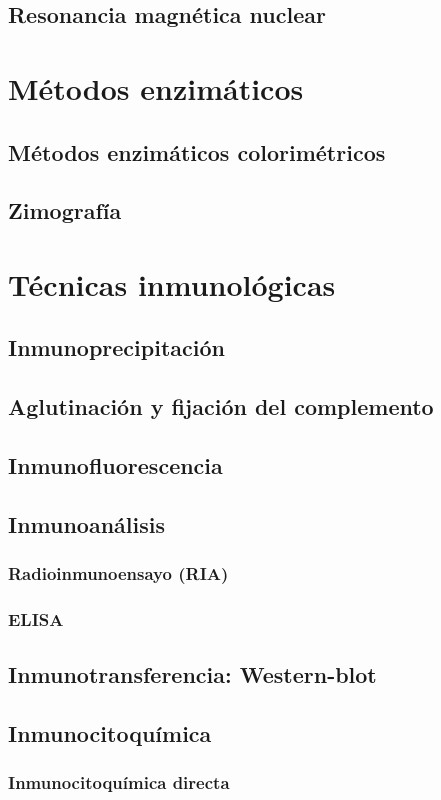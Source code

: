 \section{Resonancia magnética nuclear}
\chapter{Métodos enzimáticos}
\section{Métodos enzimáticos colorimétricos}
\section{Zimografía}
\chapter{Técnicas inmunológicas}
\section{Inmunoprecipitación}
\section{Aglutinación y fijación del complemento}
\section{Inmunofluorescencia}
\section{Inmunoanálisis}
\subsection{Radioinmunoensayo (RIA)}
\subsection{ELISA}
\section{Inmunotransferencia: Western-blot}
\section{Inmunocitoquímica}
\subsection{Inmunocitoquímica directa}
